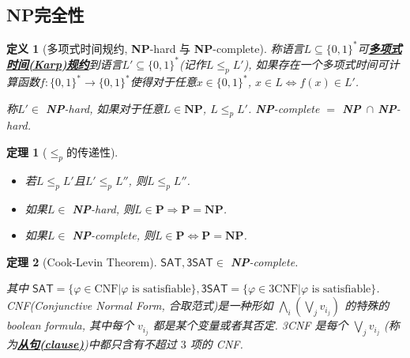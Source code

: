 \documentclass[8pt]{article}
\theoremstyle{compact}
\newtheorem{theorem}{定理}[section]
\newtheorem{definition}{定义}[section]
\def\obj#1{\textbf{\uline{#1}}}
\def\le{\leqslant}
\def\P{\textbf{P}}
\def\NP{\textbf{NP}}
\begin{document}
\subsection{\NP 完全性}
\begin{definition}[多项式时间规约, \NP-hard 与 \NP-complete]
	称语言$L \subseteq \{0, 1\}^*$可\obj{多项式时间(Karp)规约}到语言$L' \subseteq \{0, 1\}^*$(记作$L \le_p L'$), 如果存在一个多项式时间可计算函数$f: \{0, 1\}^* \to \{0, 1\}^*$使得对于任意$x \in \{0, 1\}^*$, $x \in L \Leftrightarrow f(x) \in L'$. 

	称$L' \in $ \NP-hard, 如果对于任意$L \in \NP$, $L \le_p L'$. \NP-complete $=$ \NP\ $\cap$ \NP-hard.  
\end{definition}
\begin{theorem}[$\le_p$的传递性]
	\begin{itemize}
		\item 若$L \le_p L'$且$L' \le_p L''$, 则$L \le_p L''$. 
		\item 如果$L \in $ \NP-hard, 则$L \in \P \Rightarrow \P = \NP$. 
		\item 如果$L \in $ \NP-complete, 则$L \in \P \Leftrightarrow \P = \NP$. 
	\end{itemize}
\end{theorem}
\begin{theorem}[Cook-Levin Theorem]
	$\textsf{SAT}, \textsf{3SAT} \in $ \NP-complete. 

	其中 $\textsf{SAT} = \{\varphi \in \text{CNF} | \varphi \text{ is satisfiable}\}, \textsf{3SAT} = \{\varphi \in 3\text{CNF} | \varphi \text{ is satisfiable}\}$. CNF(Conjunctive Normal Form, 合取范式)是一种形如 $\bigwedge_i\left(\bigvee_j v_{i_j}\right)$ 的特殊的 boolean formula, 其中每个 $v_{i_j}$ 都是某个变量或者其否定. 3CNF 是每个 $\bigvee_j v_{i_j}$ (称为\obj{从句(clause)})中都只含有不超过 $3$ 项的 CNF.
\end{theorem}
\end{document}
